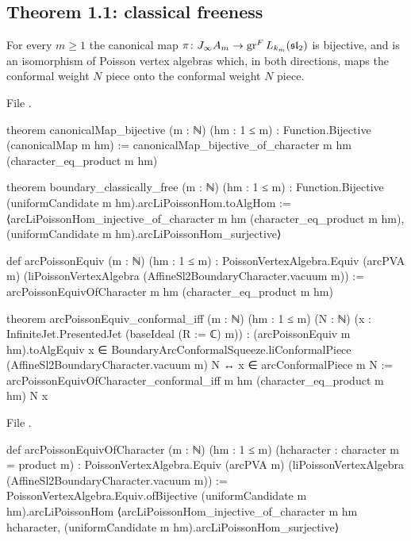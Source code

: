 \subsection{Theorem 1.1: classical freeness}

\begin{theorem}\label{l20:thm:freeness}
For every $m\ge1$ the canonical map $\pi\colon J_\infty A_m\to\operatorname{gr}^F L_{k_m}(\mathfrak{sl}_2)$ is bijective, and is an
isomorphism of Poisson vertex algebras which, in both directions, maps the conformal weight $N$ piece onto the
conformal weight $N$ piece.
\end{theorem}
\noindent File .
\begin{leancode}
theorem canonicalMap_bijective (m : ℕ) (hm : 1 ≤ m) :
    Function.Bijective (canonicalMap m hm) :=
  canonicalMap_bijective_of_character m hm (character_eq_product m hm)

theorem boundary_classically_free (m : ℕ) (hm : 1 ≤ m) :
    Function.Bijective (uniformCandidate m hm).arcLiPoissonHom.toAlgHom :=
  ⟨arcLiPoissonHom_injective_of_character m hm (character_eq_product m hm),
    (uniformCandidate m hm).arcLiPoissonHom_surjective⟩

def arcPoissonEquiv (m : ℕ) (hm : 1 ≤ m) :
    PoissonVertexAlgebra.Equiv (arcPVA m)
      (liPoissonVertexAlgebra (AffineSl2BoundaryCharacter.vacuum m)) :=
  arcPoissonEquivOfCharacter m hm (character_eq_product m hm)

theorem arcPoissonEquiv_conformal_iff (m : ℕ) (hm : 1 ≤ m) (N : ℕ)
    (x : InfiniteJet.PresentedJet (baseIdeal (R := ℂ) m)) :
    (arcPoissonEquiv m hm).toAlgEquiv x ∈
      BoundaryArcConformalSqueeze.liConformalPiece (AffineSl2BoundaryCharacter.vacuum m) N ↔
      x ∈ arcConformalPiece m N :=
  arcPoissonEquivOfCharacter_conformal_iff m hm (character_eq_product m hm) N x
\end{leancode}
\noindent File .
\begin{leancode}
def arcPoissonEquivOfCharacter (m : ℕ) (hm : 1 ≤ m)
    (hcharacter : character m = product m) :
    PoissonVertexAlgebra.Equiv (arcPVA m) (liPoissonVertexAlgebra (AffineSl2BoundaryCharacter.vacuum m)) :=
  PoissonVertexAlgebra.Equiv.ofBijective (uniformCandidate m hm).arcLiPoissonHom
    ⟨arcLiPoissonHom_injective_of_character m hm hcharacter,
      (uniformCandidate m hm).arcLiPoissonHom_surjective⟩
\end{leancode}

